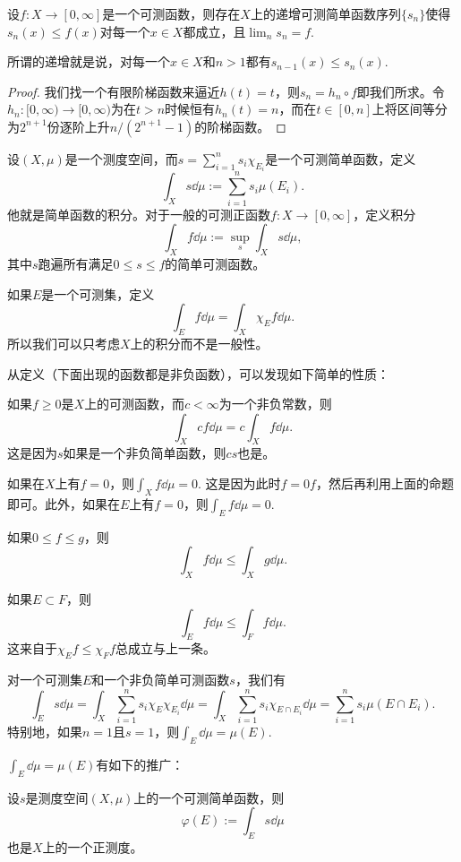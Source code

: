 \begin{pro}
设$f:X\to [0,\infty]$是一个可测函数，则存在$X$上的递增可测简单函数序列$\{s_n\}$使得$s_n(x)\leq f(x)$对每一个$x\in X$都成立，且$\lim_n s_n =f$.
\end{pro}

所谓的递增就是说，对每一个$x\in X$和$n>1$都有$s_{n-1}(x)\leq s_n(x)$.

\begin{proof}
我们找一个有限阶梯函数来逼近$h(t)=t$，则$s_n=h_n\circ f$即我们所求。令$h_n:[0,\infty)\to [0,\infty)$为在$t>n$时候恒有$h_n(t)=n$，而在$t\in [0,n]$上将区间等分为$2^{n+1}$份逐阶上升$n/(2^{n+1}-1)$的阶梯函数。
\end{proof}

\begin{para}
设$(X,\mu)$是一个测度空间，而$s=\sum_{i=1}^n s_i \chi_{E_i}$是一个可测简单函数，定义
\[
	\int_X s \dd \mu:=\sum_{i=1}^n s_i \mu(E_i).
\]
他就是简单函数的积分。对于一般的可测正函数$f:X\to [0,\infty]$，定义积分
\[
	\int_X f\dd \mu:=\sup_s \int_X s\dd \mu,
\]
其中$s$跑遍所有满足$0\leq s \leq f$的简单可测函数。

如果$E$是一个可测集，定义
\[
	\int_E f\dd \mu =\int_X \chi_E f\dd \mu.
\]
所以我们可以只考虑$X$上的积分而不是一般性。
\end{para}

从定义（下面出现的函数都是非负函数），可以发现如下简单的性质：
\begin{compactenum}[(1)]
\item 如果$f\geq 0$是$X$上的可测函数，而$c<\infty$为一个非负常数，则
\[
	\int_X cf\dd \mu=c\int_X f\dd \mu.
\]
这是因为$s$如果是一个非负简单函数，则$cs$也是。
\item 如果在$X$上有$f=0$，则$\int_X f\dd \mu=0$. 这是因为此时$f=0f$，然后再利用上面的命题即可。此外，如果在$E$上有$f=0$，则$\int_E f\dd \mu=0$.
\item 如果$0\leq f\leq g$，则
\[
	\int_X f\dd \mu\leq \int_X g \dd \mu.
\]
\item 如果$E\subset F$，则
\[
	\int_E f\dd \mu\leq \int_F f \dd \mu.
\]
这来自于$\chi_E f\leq \chi_F f$总成立与上一条。
\item 对一个可测集$E$和一个非负简单可测函数$s$，我们有
\[
	\int_E s\dd \mu =\int_X \sum_{i=1}^ns_i\chi_E  \chi_{E_i}\dd\mu=\int_X \sum_{i=1}^ns_i\chi_{E\cap E_i}\dd\mu=\sum_{i=1}^ns_i\mu(E\cap E_i).
\]
特别地，如果$n=1$且$s=1$，则$\int_E \dd \mu=\mu(E)$.
\end{compactenum}

$\int_E \dd \mu=\mu(E)$有如下的推广：
\begin{pro}
设$s$是测度空间$(X,\mu)$上的一个可测简单函数，则
\[
	\varphi(E):=\int_E s\dd\mu
\]
也是$X$上的一个正测度。
\end{pro}

